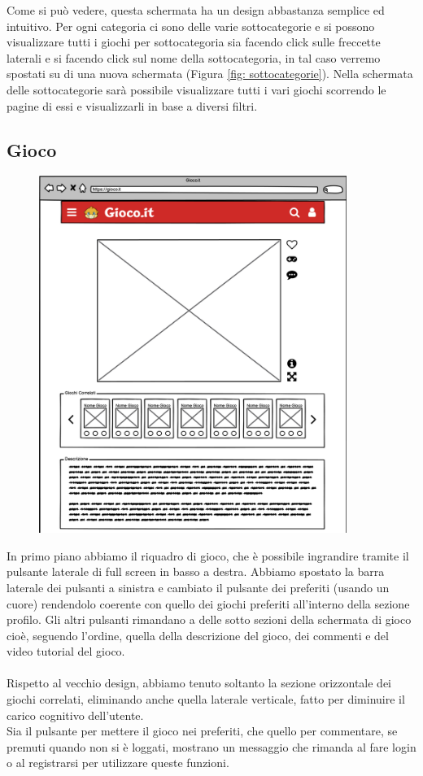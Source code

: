 \documentclass[../Report.tex]{subfiles}
\begin{document}
    Come si può vedere, questa schermata ha un design abbastanza semplice ed intuitivo. Per ogni categoria ci sono delle varie sottocategorie e si possono visualizzare tutti i giochi per sottocategoria sia facendo click sulle freccette laterali e si facendo click sul nome della sottocategoria, in tal caso verremo spostati su di una nuova schermata (Figura \ref{fig: sottocategorie}). Nella schermata delle sottocategorie sarà possibile visualizzare tutti i vari giochi scorrendo le pagine di essi e visualizzarli in base a diversi filtri.


    \subsection{Gioco}
    \begin{figure}[H]
        \includegraphics[width=10cm]{WGioco_1.png}
        \centering
    \end{figure}
    In primo piano abbiamo il riquadro di gioco, che è possibile ingrandire tramite il pulsante laterale di full screen in basso a destra. Abbiamo spostato la barra laterale dei pulsanti a sinistra e cambiato il pulsante dei preferiti (usando un cuore) rendendolo coerente con quello dei giochi preferiti all'interno della sezione profilo. Gli altri pulsanti rimandano a delle sotto sezioni della schermata di gioco cioè, seguendo l'ordine, quella della descrizione del gioco, dei commenti e del video tutorial del gioco.\\
    \\
    Rispetto al vecchio design, abbiamo tenuto soltanto la sezione orizzontale dei giochi correlati, eliminando anche quella laterale verticale, fatto per diminuire il carico cognitivo dell'utente.\\
    Sia il pulsante per mettere il gioco nei preferiti, che quello per commentare, se premuti quando non si è loggati, mostrano un messaggio che rimanda al fare login o al registrarsi  per utilizzare queste funzioni.
\end{document}

